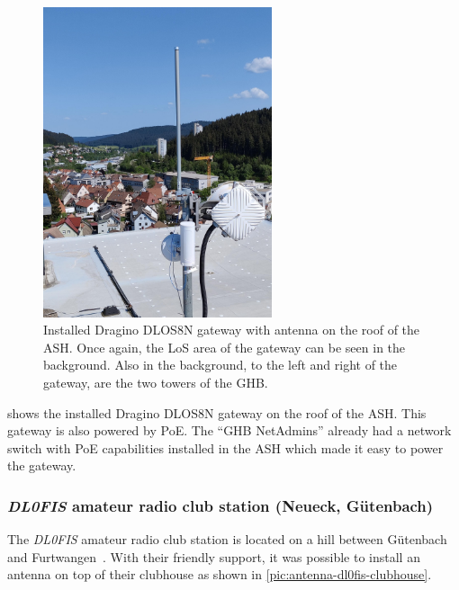 \begin{figure}[htbp]
    \centering
    \includegraphics[width=0.6\textwidth]{pictures/hardware/gateway-deployment/gateway_ash.jpg}
    \caption{
        Installed Dragino DLOS8N gateway with antenna on the roof of the \ac{ASH}.
        Once again, the \ac{LoS} area of the gateway can be seen in the background.
        Also in the background, to the left and right of the gateway, are the two towers of the \ac{GHB}.
    }\label{pic:dragino-gateway-ash}
\end{figure}

 shows the installed Dragino DLOS8N gateway on the roof of the \ac{ASH}.
This gateway is also powered by \ac{PoE}.
The ``\ac{GHB} NetAdmins'' already had a network switch with \ac{PoE} capabilities installed in the \ac{ASH} which made it easy to power the gateway.

\subsubsection{\emph{DL0FIS} amateur radio club station (Neueck, Gütenbach)}

The \emph{DL0FIS} amateur radio club station is located on a hill between Gütenbach and Furtwangen~\cite{dl0fis_clubstation_2023}.
With their friendly support, it was possible to install an antenna on top of their clubhouse as shown in \cref{pic:antenna-dl0fis-clubhouse}.

